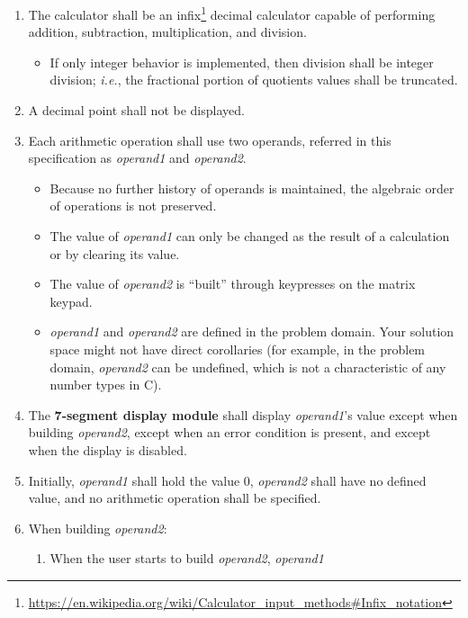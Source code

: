\begin{enumerate}
\item \label{spec:IntegerCalculator} The calculator shall be an
    infix\footnote{\url{https://en.wikipedia.org/wiki/Calculator_input_methods#Infix_notation}}
    decimal calculator capable of performing addition, subtraction,
    multiplication, and division.
    \begin{itemize}
    \item If only integer behavior is implemented, then division shall be
        integer division; \textit{i.e.}, the fractional portion of quotients
        values shall be truncated.
    \end{itemize}
\item \label{spec:NoDecimalPoint} A decimal point shall not be displayed.
\item Each arithmetic operation shall use two operands, referred in this
    specification as \textit{operand1} and \textit{operand2}.
    \begin{itemize}
    \item Because no further history of operands is maintained, the algebraic
        order of operations is not preserved.
    \item The value of \textit{operand1} can only be changed as the result of a
        calculation or by clearing its value.
    \item The value of \textit{operand2} is ``built'' through keypresses on the
        matrix keypad.
    \item \textit{operand1} and \textit{operand2} are defined in the problem
        domain. Your solution space might not have direct corollaries (for
        example, in the problem domain, \textit{operand2} can be undefined,
        which is not a characteristic of any number types in C).
    \end{itemize}
\item The \textbf{7-segment display module} shall display \textit{operand1}'s
    value except when building \textit{operand2}, except when an error
    condition is present, and except when the display is disabled.
\item Initially, \textit{operand1} shall hold the value 0, \textit{operand2}
    shall have no defined value, and no arithmetic operation shall be specified.
\item \label{spec:BuildingValue} When building \textit{operand2}:
    \begin{enumerate}
    \item When the user starts to build \textit{operand2}, \textit{operand1}

\end{enumerate}
\end{enumerate}

